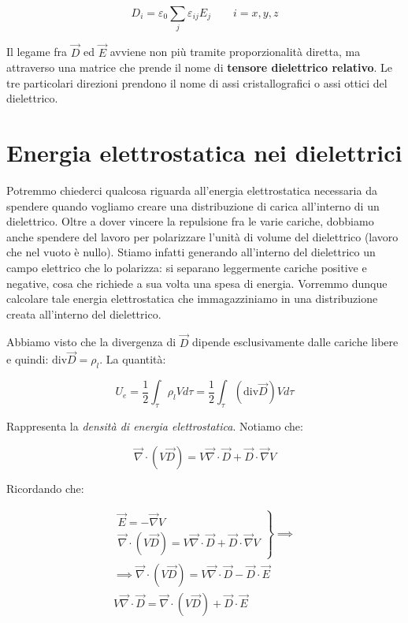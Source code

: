 \[
	D_i = \varepsilon_0 \sum_j \varepsilon_{ij} E_j \qquad i=x,y,z
\]

Il legame fra $\vec{D}$ ed $\vec{E}$ avviene non più tramite proporzionalità diretta, ma attraverso una matrice che prende il nome di \textbf{tensore dielettrico relativo}. Le tre particolari direzioni prendono il nome di assi cristallografici o assi ottici del dielettrico.

\section{Energia elettrostatica nei dielettrici}

Potremmo chiederci qualcosa riguarda all'energia elettrostatica necessaria da spendere quando vogliamo creare una distribuzione di carica all'interno di un dielettrico. Oltre a dover vincere la repulsione fra le varie cariche, dobbiamo anche spendere del lavoro per polarizzare l'unità di volume del dielettrico (lavoro che nel vuoto è nullo). Stiamo infatti generando all'interno del dielettrico un campo elettrico che lo polarizza: si separano leggermente cariche positive e negative, cosa che richiede a sua volta una spesa di energia. Vorremmo dunque calcolare tale energia elettrostatica che immagazziniamo in una distribuzione creata all'interno del dielettrico.

Abbiamo visto che la divergenza di $\vec{D}$ dipende esclusivamente dalle cariche libere e quindi: $ \text{div}\vec{D} =\rho_l  $. La quantità:

\[
	U_e = \frac{1}{2} \int_{\tau}\rho_lVd\tau = \frac{1}{2} \int_{\tau}(\text{div}\vec{D})Vd\tau
\]

Rappresenta la \emph{densità di energia elettrostatica}. Notiamo che:

\[
	\vec{\nabla} \cdot (V\vec{D}) = V\vec{\nabla} \cdot \vec{D} + \vec{D} \cdot \vec{\nabla} V
\]

Ricordando che:

\begin{gather*}
	\left. \begin{array}{r}
	 	\vec{E} = - \vec{\nabla} V \\
		\vec{\nabla} \cdot (V\vec{D}) = V\vec{\nabla} \cdot \vec{D} + \vec{D} \cdot \vec{\nabla} V
	\end{array} \right\} \implies \\
	\implies \vec{\nabla} \cdot (V\vec{D}) = V\vec{\nabla} \cdot \vec{D} -  \vec{D} \cdot \vec{E} \\
	V\vec{\nabla} \cdot \vec{D} = \vec{\nabla} \cdot (V\vec{D}) + \vec{D} \cdot \vec{E}
\end{gather*}

